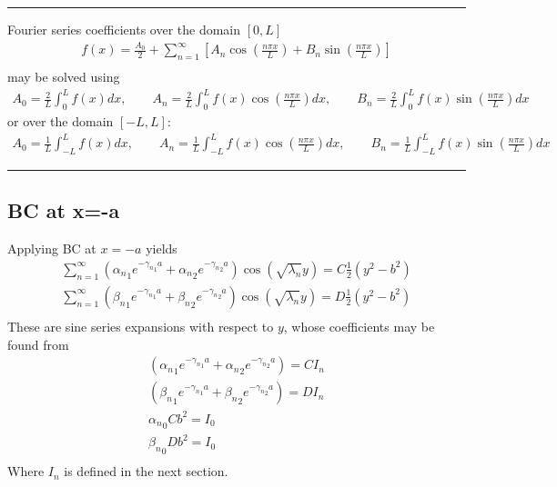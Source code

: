 \documentclass[11pt]{article}
\begin{document}
\noindent \rule{\textwidth}{1pt}
Fourier series coefficients over the domain $[0,L]$
\begin{equation}\begin{aligned}
f(x) = \frac{A_0}{2} + \sum_{n=1}^{\infty} \left[ A_n \cos\left( \frac{n \pi x}{L} \right) + B_n \sin\left( \frac{n \pi x}{L} \right) \right] \\
\end{aligned} \end{equation}
may be solved using
\begin{equation}\begin{aligned}
A_0 = \frac{2}{L} \int_0^L f(x) dx, \qquad
A_n = \frac{2}{L} \int_0^L f(x) \cos\left( \frac{n \pi x}{L} \right) dx, \qquad
B_n = \frac{2}{L} \int_0^L f(x) \sin\left( \frac{n \pi x}{L} \right) dx
\end{aligned} \end{equation}
or over the domain $[-L,L]$:
\begin{equation}\begin{aligned}
A_0 = \frac{1}{L} \int_{-L}^L f(x) dx, \qquad
A_n = \frac{1}{L} \int_{-L}^L f(x) \cos\left( \frac{n \pi x}{L} \right) dx, \qquad
B_n = \frac{1}{L} \int_{-L}^L f(x) \sin\left( \frac{n \pi x}{L} \right) dx
\end{aligned} \end{equation}
\noindent \rule{\textwidth}{1pt}

\subsection{BC at x=-a}
Applying BC at $x=-a$ yields
\begin{equation}\begin{aligned}
\sum_{n=1}^{\infty} \left( {\alpha_n}_1 e^{-{\gamma_n}_1 a} + {\alpha_n}_2 e^{-{\gamma_n}_2 a} \right) \cos(\sqrt{\lambda_n} y) = C \frac{1}{2} (y^2-b^2) \\
\sum_{n=1}^{\infty} \left( {\beta_n}_1  e^{-{\gamma_n}_1 a} + {\beta_n}_2  e^{-{\gamma_n}_2 a} \right) \cos(\sqrt{\lambda_n} y) = D \frac{1}{2} (y^2-b^2) \\
\end{aligned} \end{equation}
These are sine series expansions with respect to $y$, whose coefficients may be found from
\begin{equation}\begin{aligned}
\left( {\alpha_n}_1 e^{-{\gamma_n}_1 a} + {\alpha_n}_2 e^{-{\gamma_n}_2 a} \right) = C I_n \\
\left( {\beta_n}_1  e^{-{\gamma_n}_1 a} + {\beta_n}_2  e^{-{\gamma_n}_2 a} \right) = D I_n \\
{\alpha_n}_0 C b^2 = I_0 \\
{\beta_n}_0  D b^2 = I_0 \\
\end{aligned} \end{equation}
Where $I_n$ is defined in the next section.
\end{document}

